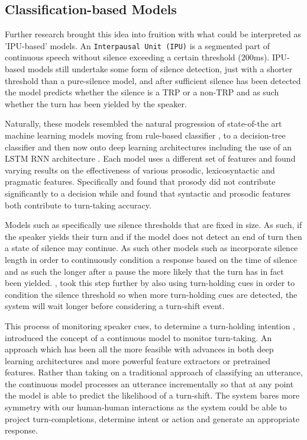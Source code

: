 \documentclass[logo,bsc,singlespacing,parskip]{infthesis}
\begin{document}
\subsection{Classification-based Models}
Further research brought this idea into fruition with what could be interpreted as 'IPU-based' models. An \texttt{Interpausal Unit (IPU)} is a segmented part of continuous speech without silence exceeding a certain threshold (200ms). IPU-based models still undertake some form of silence detection, just with a shorter threshold than a pure-silence model, and after sufficient silence has been detected the model predicts whether the silence is a TRP or a non-TRP and as such whether the turn has been yielded by the speaker.

Naturally, these models resembled the natural progression of state-of-the art machine learning models moving from rule-based classifier \cite{Bell2001}, to a decision-tree classifier \cite{Sato2002, Ferrer2002, Schlangen2006, Meena2014, Raux2008} and then now onto deep learning architectures including the use of an LSTM RNN architecture \cite{Maier2017}. 
Each model uses a different set of features and found varying results on the effectiveness of various prosodic, lexicosyntactic and pragmatic features. Specifically \cite{Sato2002} and \cite{Meena2014} found that prosody did not contribute significantly to a decision while \cite{Ferrer2002} and \cite{Schlangen2006} found that syntactic and prosodic features both contribute to turn-taking accuracy.

Models such as \cite{Sato2002, Schlangen2006, Meena2014} specifically use silence thresholds that are fixed in size. As such, if the speaker yields their turn and if the model does not detect an end of turn then a state of silence may continue.
As such other models such as \cite{Ferrer2002, Raux2008} incorporate silence length in order to continuously condition a response based on the time of silence and as such the longer after a pause the more likely that the turn has in fact been yielded. \cite{Raux2008}, took this step further by also using turn-holding cues in order to condition the silence threshold so when more turn-holding cues are detected, the system will wait longer before considering a turn-shift event. 

This process of monitoring speaker cues, to determine a turn-holding intention \cite{Raux2008}, introduced the concept of a continuous model to monitor turn-taking. An approach which has been all the more feasible with advances in both deep learning architectures and more powerful feature extractors or pretrained features. Rather than taking on a traditional approach of classifying an utterance, the continuous model processes an utterance incrementally so that at any point the model is able to predict the likelihood of a turn-shift. The system bares more symmetry with our human-human interactions as the system could be able to project turn-completions, determine intent or action and generate an appropriate response. 
\end{document}
